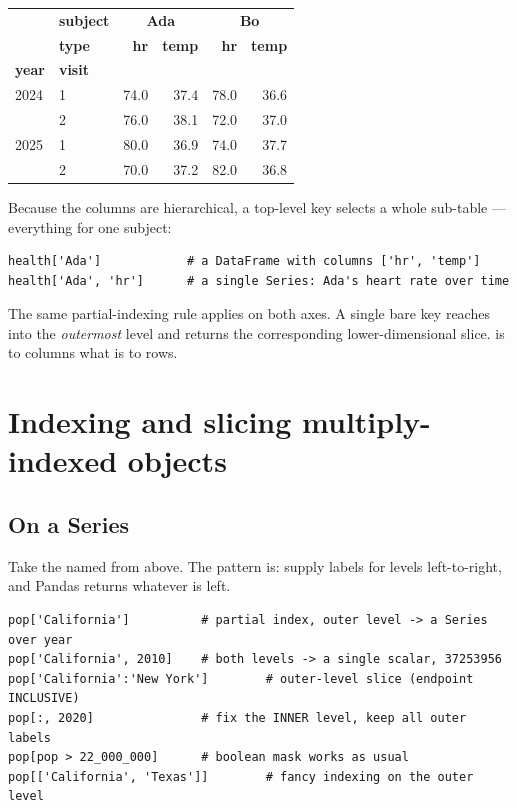 \documentclass[11pt]{article}
\begin{document}
\begin{center}
\renewcommand{\arraystretch}{1.2}
\begin{tabular}{l l r r r r}
\toprule
 & \textbf{subject} & \multicolumn{2}{c}{\textbf{Ada}} & \multicolumn{2}{c}{\textbf{Bo}} \\
 & \textbf{type} & \textbf{hr} & \textbf{temp} & \textbf{hr} & \textbf{temp} \\
\textbf{year} & \textbf{visit} & & & & \\
\midrule
2024 & 1 & 74.0 & 37.4 & 78.0 & 36.6 \\
     & 2 & 76.0 & 38.1 & 72.0 & 37.0 \\
2025 & 1 & 80.0 & 36.9 & 74.0 & 37.7 \\
     & 2 & 70.0 & 37.2 & 82.0 & 36.8 \\
\bottomrule
\end{tabular}
\end{center}

Because the columns are hierarchical, a top-level key selects a whole sub-table --- everything for one subject:

\begin{lstlisting}
health['Ada']            # a DataFrame with columns ['hr', 'temp']
health['Ada', 'hr']      # a single Series: Ada's heart rate over time
\end{lstlisting}

\begin{keyidea}
The same partial-indexing rule applies on both axes. A single bare key reaches into the \emph{outermost} level and returns the corresponding lower-dimensional slice.  is to columns what  is to rows.
\end{keyidea}

\section{Indexing and slicing multiply-indexed objects}

\subsection{On a Series}

Take the named  from above. The pattern is: supply labels for levels left-to-right, and Pandas returns whatever is left.

\begin{lstlisting}
pop['California']          # partial index, outer level -> a Series over year
pop['California', 2010]    # both levels -> a single scalar, 37253956
pop['California':'New York']        # outer-level slice (endpoint INCLUSIVE)
pop[:, 2020]               # fix the INNER level, keep all outer labels
pop[pop > 22_000_000]      # boolean mask works as usual
pop[['California', 'Texas']]        # fancy indexing on the outer level
\end{lstlisting}
\end{document}
